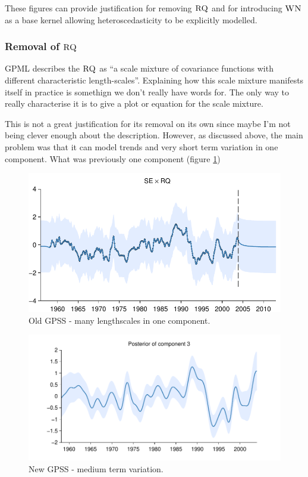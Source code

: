 \documentclass{article}
\begin{document}
These figures can provide justification for removing ${\textsc{RQ}}$ and for introducing ${\textsc{WN}}$ as a base kernel allowing heteroscedasticity to be explicitly modelled.

\subsubsection{Removal of ${\textsc{RQ}}$}

GPML describes the ${\textsc{RQ}}$ as ``a scale mixture of \kSE covariance functions with different characteristic length-scales''.
Explaining how this scale mixture manifests itself in practice is somethign we don't really have words for.
The only way to really characterise it is to give a plot or equation for the scale mixture.

This is not a great justification for its removal on its own since maybe I'm not being clever enough about the description.
However, as discussed above, the main problem was that it can model trends and very short term variation in one component.
What was previously one component (figure \ref{fig:RQ})

\begin{figure}[h]
\centering
\includegraphics[width=0.98\columnwidth]{figures/old-gpss/03-mauna2003-s_3}
\caption{Old GPSS - many lengthscales in one component.}
\label{fig:RQ}
\end{figure}

\begin{figure}[h]
\centering
\includegraphics[width=0.98\columnwidth]{figures/03-mauna/03-mauna_3}
\caption{New GPSS - medium term variation.}
\label{fig:medium}
\end{figure}
\end{document}
